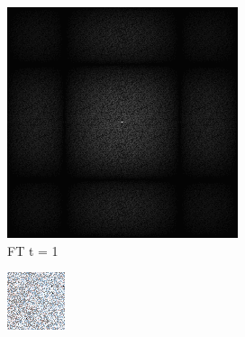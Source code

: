 \begin{figure}[H]
\begin{tcolorbox}[boxrule=4pt,sharp corners=downhill,title=Bedeutung des Retargeting]
\begin{subfigure}[b]{0.2\linewidth}
      \includegraphics[width=\linewidth]{content/TemporalerAlg/Bilder/Retargeting/Bedeutung Retargeting/Sorting_Small_Block/Spektrum/Ausschnitt2.png}
      \caption{FT t = 1}
      \label{pic:sortier_t1}
    \end{subfigure}
    \begin{subfigure}[b]{0.2\linewidth}
      \includegraphics[width=\linewidth]{content/TemporalerAlg/Bilder/Retargeting/Bedeutung Retargeting/Sorting_Small_Block/Ausschnitt/Ausschnitt3.png}

\end{subfigure}
\end{tcolorbox}
\end{figure}
